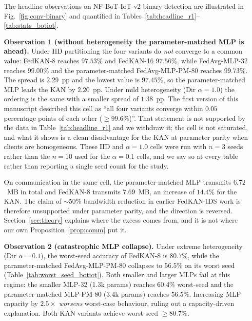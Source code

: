 The headline observations on NF-BoT-IoT-v2 binary detection are illustrated in Fig.~\ref{fig:conv-binary} and quantified in Tables~\ref{tab:headline_r1}--\ref{tab:stats_botiot}.

\textbf{Observation 1 (without heterogeneity the parameter-matched MLP is ahead).} Under IID
partitioning the four variants do \emph{not} converge to a common value: FedKAN-8 reaches
$97.53\%$ and FedKAN-16 $97.56\%$, while FedAvg-MLP-32 reaches $99.00\%$ and the
parameter-matched FedAvg-MLP-PM-80 reaches $99.73\%$. The spread is $2.29$~pp and the lowest
value is $97.45\%$, so the parameter-matched MLP leads the KAN by $2.20$~pp. Under mild
heterogeneity (Dir $\alpha=1.0$) the ordering is the same with a smaller spread of $1.38$~pp.
The first version of this manuscript described this cell as ``all four variants converge within
$0.05$ percentage points of each other ($\geq 99.6\%$)''. That statement is not supported by the
data in Table~\ref{tab:headline_r1} and we withdraw it; the cell is not saturated, and what
it shows is a clean disadvantage for the KAN at parameter parity when clients are homogeneous.
These IID and $\alpha=1.0$ cells were run with $n=3$ seeds rather than the $n=10$ used for the
$\alpha=0.1$ cells, and we say so at every table rather than reporting a single seed count for
the study.

On communication in the same cell, the parameter-matched MLP transmits $6.72$~MB in total and
FedKAN-8 transmits $7.69$~MB, an increase of $14.4\%$ for the KAN. The claim of
$\sim 50\%$ bandwidth reduction in earlier FedKAN-IDS work is therefore unsupported under
parameter parity, and the direction is reversed. Section~\ref{sec:theory} explains where the
excess comes from, and it is not where our own Proposition~\ref{prop:comm} put it.

\textbf{Observation 2 (catastrophic MLP collapse).} Under extreme heterogeneity (Dir $\alpha = 0.1$), the worst-seed accuracy of FedKAN-8 is $80.7\%$, while the parameter-matched FedAvg-MLP-PM-80 collapses to $56.5\%$ on its worst seed (Table~\ref{tab:worst_seed_botiot}). Both smaller and larger MLPs fail at this regime: the smaller MLP-32 (1.3k params) reaches $60.4\%$ worst-seed and the parameter-matched MLP-PM-80 (3.4k params) reaches $56.5\%$. Increasing MLP capacity by $2.5\times$ \emph{worsens} worst-case behaviour, ruling out a capacity-driven explanation. Both KAN variants achieve worst-seed $\geq 80.7\%$.

